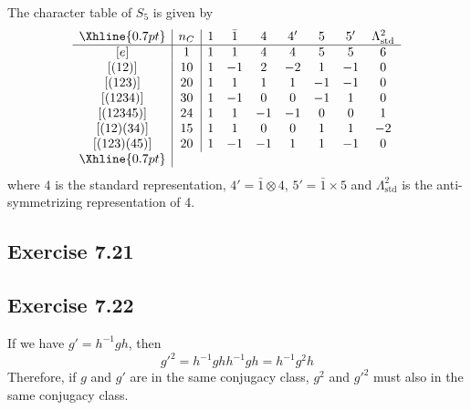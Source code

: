 \documentclass[]{ctexart}
\begin{document}
The character table of $S_5$ is given by 
\begin{equation*}
\begin{array}{c|c|ccccccc}
\Xhline{0.7pt}
& n_C & 1 & \bar 1& 4 & 4' & 5 & 5' & \Lambda^2_{\text{std}}\\
\hline 
[e] & 1 & 1 & 1 & 4 & 4 & 5 & 5 & 6\\
{[(12)]} & 10 & 1 & -1 & 2 & -2 & 1 & -1 & 0\\
{[(123)]} & 20 & 1 & 1 & 1 & 1 & -1 & -1 & 0\\
{[(1234)]} & 30 & 1 & -1 & 0 & 0 & -1 & 1 & 0\\
{[(12345)]} & 24 & 1 & 1 & -1 & -1 & 0 & 0 & 1\\
{[(12)(34)]} & 15 & 1 & 1 & 0 & 0 & 1 & 1 & -2\\
{[(123)(45)]} & 20 & 1 & -1 & -1 & 1 & 1 & -1 & 0\\
\Xhline{0.7pt}
\end{array}
\end{equation*}
where $4$ is the standard representation, $4'=\bar 1\otimes 4$, $5'=\bar 1\times 5$ and $\Lambda^2_{\text{std}}$ is the anti-symmetrizing representation of 4. 
\subsection{Exercise 7.21}
\subsection{Exercise 7.22}
If we have $g'=h^{-1}gh$, then 
\begin{equation*}
g'^2=h^{-1}ghh^{-1}gh=h^{-1}g^2 h
\end{equation*}
Therefore, if $g$ and $g'$ are in the same conjugacy class, $g^2$ and $g'^2$ must also in the same conjugacy class. 
\end{document}
